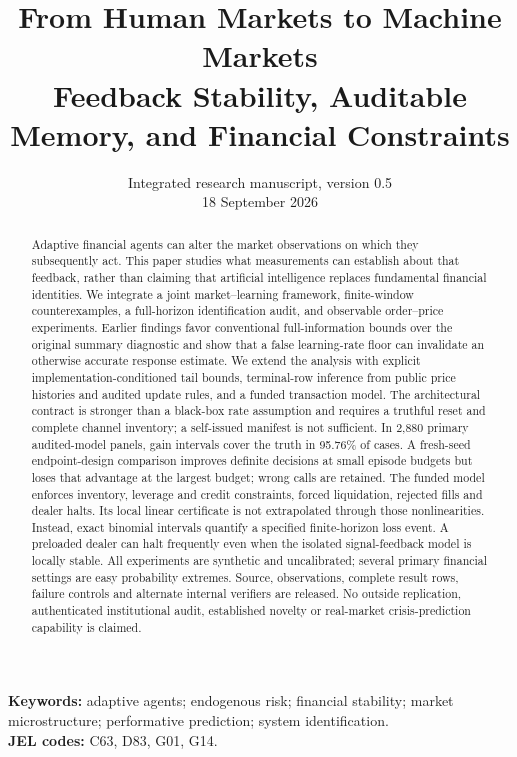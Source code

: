 \documentclass[11pt,a4paper]{article}
\title{\textbf{From Human Markets to Machine Markets}\\[0.45em]
\large Feedback Stability, Auditable Memory, and Financial Constraints}
\author{}
\date{Integrated research manuscript, version 0.5\\18 September 2026}
\theoremstyle{definition}
\theoremstyle{remark}
\begin{document}
\maketitle
\vspace{-1.4em}
\begin{abstract}
Adaptive financial agents can alter the market observations on which they subsequently act. This paper studies what measurements can establish about that feedback, rather than claiming that artificial intelligence replaces fundamental financial identities. We integrate a joint market--learning framework, finite-window counterexamples, a full-horizon identification audit, and observable order--price experiments. Earlier findings favor conventional full-information bounds over the original summary diagnostic and show that a false learning-rate floor can invalidate an otherwise accurate response estimate. We extend the analysis with explicit implementation-conditioned tail bounds, terminal-row inference from public price histories and audited update rules, and a funded transaction model. The architectural contract is stronger than a black-box rate assumption and requires a truthful reset and complete channel inventory; a self-issued manifest is not sufficient. In 2,880 primary audited-model panels, gain intervals cover the truth in 95.76\% of cases. A fresh-seed endpoint-design comparison improves definite decisions at small episode budgets but loses that advantage at the largest budget; wrong calls are retained. The funded model enforces inventory, leverage and credit constraints, forced liquidation, rejected fills and dealer halts. Its local linear certificate is not extrapolated through those nonlinearities. Instead, exact binomial intervals quantify a specified finite-horizon loss event. A preloaded dealer can halt frequently even when the isolated signal-feedback model is locally stable. All experiments are synthetic and uncalibrated; several primary financial settings are easy probability extremes. Source, observations, complete result rows, failure controls and alternate internal verifiers are released. No outside replication, authenticated institutional audit, established novelty or real-market crisis-prediction capability is claimed.
\end{abstract}
\noindent\textbf{Keywords:} adaptive agents; endogenous risk; financial stability; market microstructure; performative prediction; system identification.\\
\textbf{JEL codes:} C63, D83, G01, G14.
\end{document}
